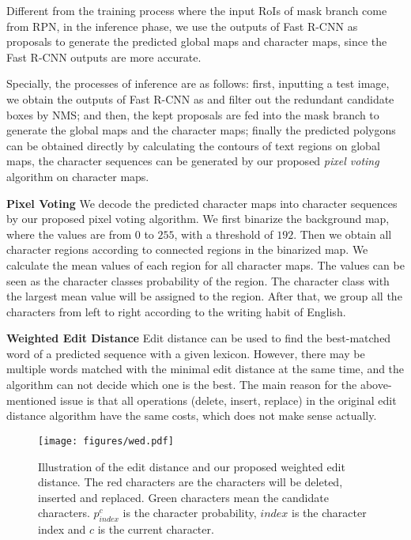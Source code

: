 \documentclass[runningheads]{llncs}
\begin{document}
Different from the training process where the input RoIs of mask branch come from RPN, in the inference phase, we use the outputs of Fast R-CNN as proposals to generate the predicted global maps and character maps, since the Fast R-CNN outputs are more accurate. 

Specially, the processes of inference are as follows: first, inputting a test image, we obtain the outputs of Fast R-CNN as \cite{ren2015faster} and filter out the redundant candidate boxes by NMS; and then, the kept proposals are fed into the mask branch to generate the global maps and the character maps; finally the predicted polygons can be obtained directly by calculating the contours of text regions on global maps, the character sequences can be generated by our proposed \textit{pixel voting} algorithm on character maps.


    



\noindent\textbf{Pixel Voting} We decode the predicted character maps into character sequences by our proposed pixel voting algorithm. We first binarize the background map, where the values are from $0$ to $255$, with a threshold of $192$. 
Then we obtain all character regions according to connected regions in the binarized map. We calculate the mean values of each region for all character maps. The values can be seen as the character classes probability of the region. The character class with the largest mean value will be assigned to the region. After that, we group all the characters from left to right according to the writing habit of English. 

\noindent\textbf{Weighted Edit Distance} Edit distance can be used to find the best-matched word of a predicted sequence with a given lexicon. However, there may be multiple words matched with the minimal edit distance at the same time, and the algorithm can not decide which one is the best. The main reason for the above-mentioned issue is that all operations (delete, insert, replace) in the original edit distance algorithm have the same costs, which does not make sense actually. 

\begin{figure}[!bp]
\begin{center}
\texttt{[image: figures/wed.pdf]}
\end{center}
\caption{Illustration of the edit distance and our proposed weighted edit distance. The red characters are the characters will be deleted, inserted and replaced. Green characters mean the candidate characters. $p_{index}^c$ is the character probability, $index$ is the character index and $c$ is the current character.}
\label{fig:wed}
\end{figure}
\end{document}
